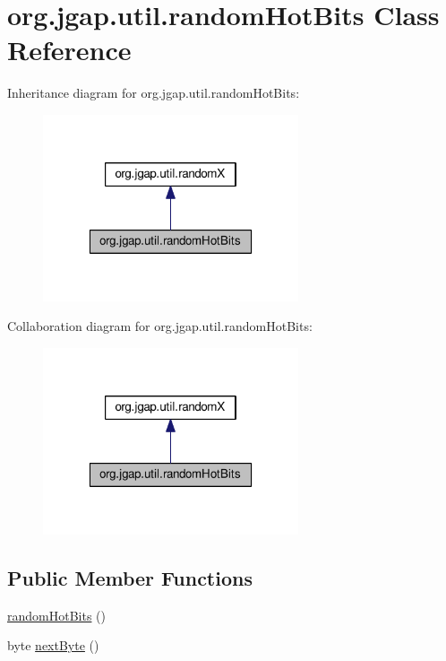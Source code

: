 \hypertarget{classorg_1_1jgap_1_1util_1_1random_hot_bits}{\section{org.\-jgap.\-util.\-random\-Hot\-Bits Class Reference}
\label{classorg_1_1jgap_1_1util_1_1random_hot_bits}
}


Inheritance diagram for org.\-jgap.\-util.\-random\-Hot\-Bits\-:
\nopagebreak
\begin{figure}[H]
\begin{center}
\leavevmode
\includegraphics[width=214pt]{classorg_1_1jgap_1_1util_1_1random_hot_bits__inherit__graph}
\end{center}
\end{figure}


Collaboration diagram for org.\-jgap.\-util.\-random\-Hot\-Bits\-:
\nopagebreak
\begin{figure}[H]
\begin{center}
\leavevmode
\includegraphics[width=214pt]{classorg_1_1jgap_1_1util_1_1random_hot_bits__coll__graph}
\end{center}
\end{figure}
\subsection*{Public Member Functions}
\begin{DoxyCompactItemize}
\item 
\hyperlink{classorg_1_1jgap_1_1util_1_1random_hot_bits_a644cee926d81ccad02f16ddc1dbe1def}{random\-Hot\-Bits} ()
\item 
byte \hyperlink{classorg_1_1jgap_1_1util_1_1random_hot_bits_a4a58860751f086577a9b0f2866a9e647}{next\-Byte} ()
\end{DoxyCompactItemize}
